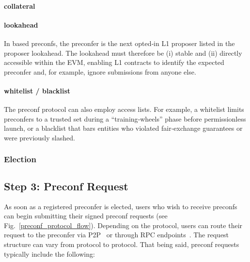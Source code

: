 \documentclass[a4paper]{article}
\theoremstyle{boldstyle}
\begin{document}
        \paragraph{collateral}
        \paragraph{lookahead}
        \label{sec:step2_lookahead}

In based preconfs, the preconfer is the next opted‑in L1 proposer listed in the proposer lookahead. The lookahead must therefore be (i) stable and (ii) directly accessible within the EVM, enabling L1 contracts to identify the expected preconfer and, for example, ignore submissions from anyone else.

        \paragraph{whitelist / blacklist}

The preconf protocol can also employ access lists. For example, a whitelist limits preconfers to a trusted set during a “training‑wheels” phase before permissionless launch, or a blacklist that bars entities who violated fair‑exchange guarantees or were previously slashed.

        \subsubsection{Election}
        
        
\subsection{Step 3: Preconf Request} \label{preconf_request}
    As soon as a registered preconfer is elected, users who wish to receive preconfs can begin submitting their signed preconf requests (see Fig.~\ref{preconf_protocol_flow}). Depending on the protocol, users can route their request to the preconfer via P2P~\cite{W:Documentation-Understandingmev-commit} or through RPC endpoints~\cite{W:Towardsanimplementationofbasedpreconfirmationsleveragingrestaking}. The request structure can vary from protocol to protocol. That being said, preconf requests typically include the following:


    
\end{document}

